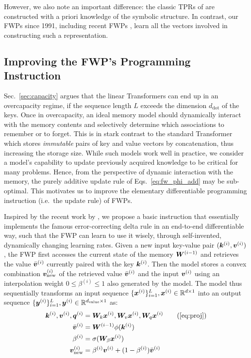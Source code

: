 \documentclass{article}
\theoremstyle{definition}
\begin{document}
However, we also note an important difference:
the classic TPRs of \citet{smolensky1990tensor}
are constructed with a priori knowledge of the symbolic structure.
In contrast, our FWPs since 1991, including  recent FWPs \citep{schlag2018learning}, learn all the vectors involved in constructing such a representation.

\subsection{Improving the FWP's Programming Instruction}
\label{sec:updaterule}
Sec.~\ref{sec:capacity} argues that the linear Transformers
can end up in an overcapacity regime, if the sequence length $L$ exceeds the
dimension $d_\text{dot}$ of the keys.
Once in overcapacity, an ideal memory model should dynamically interact with
the memory contents and selectively determine which associations to remember or to forget.
This is in stark contrast to the standard Transformer which stores \textit{immutable}
pairs of key and value vectors by concatenation, thus increasing the storage size.
While such models work well in practice, we consider a model's capability to update previously acquired knowledge to be critical for many problems.
Hence, from the perspective of dynamic interaction with the memory, the purely additive update rule of Eqs.~\ref{eq:fw_phi_add}
may be sub-optimal.
This motivates us to improve the elementary differentiable programming instruction (i.e.~the update rule) of FWPs. 

Inspired by the recent work by \citet{schlag2020fastweightmemory}, we propose a basic instruction that essentially implements the famous error-correcting delta rule \citep{widrow1960adaptive} in an end-to-end differentiable way, such that the FWP can learn to use it wisely, through  self-invented, dynamically changing learning rates. 
Given a new input key-value pair $({\bm{k}}^{(i)}, {\bm{v}}^{(i)})$,
the FWP first accesses the current state of the memory ${\bm{W}}^{(i-1)}$ and retrieves the value $\bar{{\bm{v}}}^{(i)}$ currently paired with the key ${\bm{k}}^{(i)}$. Then the model stores
a convex combination ${\bm{v}}^{(i)}_\text{new}$ of the retrieved value $\bar{{\bm{v}}}^{(i)}$ and the input ${\bm{v}}^{(i)}$
using an interpolation weight $0 \leq \beta^{(i)} \leq 1$ also generated by the model.
The model thus sequentially transforms an input sequence $\{ {\bm{x}}^{(i)} \}_{i=1}^L, {\bm{x}}^{(i)} \in \mathbb{R}^{d\times1}$
into an output sequence $\{ {\bm{y}}^{(i)} \}_{i=1}^L, {\bm{y}}^{(i)} \in \mathbb{R}^{d_\text{value}\times1}$ as:
\begin{align}
\vk^{(i)}, \vv^{(i)}, \vq^{(i)} &= \mW_k \vx^{(i)}, \mW_v \vx^{(i)}, \mW_q \vx^{(i)} \tag{\ref{eq:proj}} \\
\bar{\vv}^{(i)} &= \mW^{(i-1)} \phi(\vk^{(i)}) \label{eq:v_old}\\
\beta^{(i)} &= \sigmoid(\mW_\beta \vx^{(i)}) \\
\vv^{(i)}_\text{new} &= \beta^{(i)} \vv^{(i)} +(1-\beta^{(i)}) \bar{\vv}^{(i)}  \label{eq:v_new}
\end{align}
\end{document}
